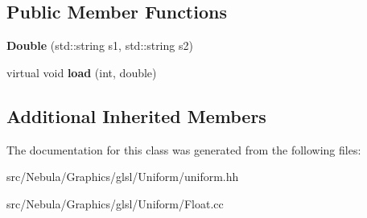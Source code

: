 \subsection*{Public Member Functions}
\begin{DoxyCompactItemize}
\item 
\hypertarget{classNeb_1_1glsl_1_1Uniform_1_1Vector_1_1Double_a4f5b3ffeff4c2d183a7af7401c434731}{{\bfseries Double} (std\-::string s1, std\-::string s2)}\label{classNeb_1_1glsl_1_1Uniform_1_1Vector_1_1Double_a4f5b3ffeff4c2d183a7af7401c434731}

\item 
\hypertarget{classNeb_1_1glsl_1_1Uniform_1_1Vector_1_1Double_a7241e6a2f7b3041cbc2beca1f83d504a}{virtual void {\bfseries load} (int, double)}\label{classNeb_1_1glsl_1_1Uniform_1_1Vector_1_1Double_a7241e6a2f7b3041cbc2beca1f83d504a}

\end{DoxyCompactItemize}
\subsection*{Additional Inherited Members}


The documentation for this class was generated from the following files\-:\begin{DoxyCompactItemize}
\item 
src/\-Nebula/\-Graphics/glsl/\-Uniform/uniform.\-hh\item 
src/\-Nebula/\-Graphics/glsl/\-Uniform/Float.\-cc\end{DoxyCompactItemize}
